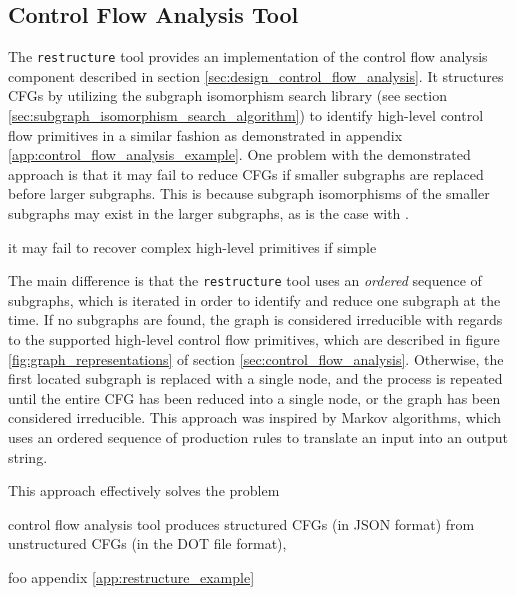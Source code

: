 
\subsection{Control Flow Analysis Tool}
\label{sec:impl_control_flow_analysis_tool}

The \texttt{restructure} tool provides an implementation of the control flow analysis component described in section \ref{sec:design_control_flow_analysis}. It structures CFGs by utilizing the subgraph isomorphism search library (see section \ref{sec:subgraph_isomorphism_search_algorithm}) to identify high-level control flow primitives in a similar fashion as demonstrated in appendix \ref{app:control_flow_analysis_example}. One problem with the demonstrated approach is that it may fail to reduce CFGs if smaller subgraphs are replaced before larger subgraphs. This is because subgraph isomorphisms of the smaller subgraphs may exist in the larger subgraphs, as is the case with .

it may fail to recover complex high-level primitives if simple


 The main difference is that the \texttt{restructure} tool uses an \textit{ordered} sequence of subgraphs, which is iterated in order to identify and reduce one subgraph at the time. If no subgraphs are found, the graph is considered irreducible with regards to the supported high-level control flow primitives, which are described in figure \ref{fig:graph_representations} of section \ref{sec:control_flow_analysis}. Otherwise, the first located subgraph is replaced with a single node, and the process is repeated until the entire CFG has been reduced into a single node, or the graph has been considered irreducible. This approach was inspired by Markov algorithms, which uses an ordered sequence of production rules to translate an input into an output string.

This approach effectively solves the problem


control flow analysis tool produces structured CFGs (in JSON format) from unstructured CFGs (in the DOT file format),

foo appendix \ref{app:restructure_example}
